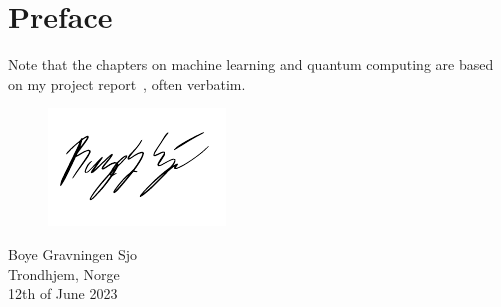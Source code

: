 \chapter{Preface}
\lipsum[1]

Note that the chapters on machine learning and quantum computing are based on my project report~\autocite{sjo2022}, often verbatim.

\vspace{1.5cm}
\begin{figure}[h]
  \raggedleft
  \includegraphics[width=0.3\linewidth]{blank.pdf}
\end{figure}
\begin{flushright}
  \vspace{-1.3cm}
  Boye Gravningen Sjo \\
  Trondhjem, Norge \\
  12th of June 2023
\end{flushright}

\cleardoublepage